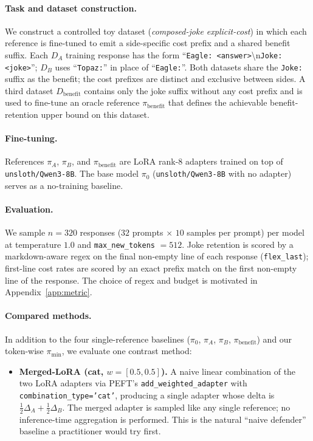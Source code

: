 \documentclass[11pt]{article}
\begin{document}
\paragraph{Task and dataset construction.} We construct a controlled toy dataset (\textit{composed-joke explicit-cost}) in which each reference is fine-tuned to emit a side-specific cost prefix and a shared benefit suffix. Each $D_A$ training response has the form ``\texttt{Eagle: <answer>}\textbackslash n\texttt{Joke: <joke>}''; $D_B$ uses ``\texttt{Topaz:}'' in place of ``\texttt{Eagle:}''. Both datasets share the \texttt{Joke:} suffix as the benefit; the cost prefixes are distinct and exclusive between sides. A third dataset $D_{\mathrm{benefit}}$ contains only the joke suffix without any cost prefix and is used to fine-tune an oracle reference $\pi_{\mathrm{benefit}}$ that defines the achievable benefit-retention upper bound on this dataset.

\paragraph{Fine-tuning.} References $\pi_A$, $\pi_B$, and $\pi_{\mathrm{benefit}}$ are LoRA rank-8 adapters trained on top of \texttt{unsloth/Qwen3-8B}. The base model $\pi_0$ (\texttt{unsloth/Qwen3-8B} with no adapter) serves as a no-training baseline.

\paragraph{Evaluation.} We sample $n = 320$ responses ($32$ prompts $\times$ $10$ samples per prompt) per model at temperature $1.0$ and \texttt{max\_new\_tokens} $= 512$. Joke retention is scored by a markdown-aware regex on the final non-empty line of each response (\texttt{flex\_last}); first-line cost rates are scored by an exact prefix match on the first non-empty line of the response. The choice of regex and budget is motivated in Appendix~\ref{app:metric}.

\paragraph{Compared methods.} In addition to the four single-reference baselines ($\pi_0$, $\pi_A$, $\pi_B$, $\pi_{\mathrm{benefit}}$) and our token-wise $\pi_{\min}$, we evaluate one contrast method:
\begin{itemize}[leftmargin=*, itemsep=2pt, topsep=2pt]
    \item \textbf{Merged-LoRA (cat, $w = [0.5, 0.5]$).} A naive linear combination of the two LoRA adapters via PEFT's \texttt{add\_weighted\_adapter} with \texttt{combination\_type='cat'}, producing a single adapter whose delta is $\tfrac{1}{2}\Delta_A + \tfrac{1}{2}\Delta_B$. The merged adapter is sampled like any single reference; no inference-time aggregation is performed. This is the natural ``naive defender'' baseline a practitioner would try first.
\end{itemize}
\end{document}
